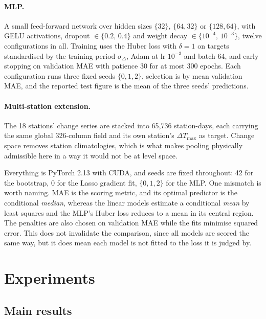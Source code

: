 \documentclass[11pt,a4paper]{article}
\newcommand{\dmax}{\Delta T_{\max}}
\begin{document}
\paragraph{MLP.} A small feed-forward network over hidden sizes $\{32\}$, $\{64,32\}$ or $\{128,64\}$, with GELU activations, dropout $\in \{0.2,\,0.4\}$ and weight decay $\in \{10^{-4},\,10^{-3}\}$, twelve configurations in all. Training uses the Huber loss with $\delta = 1$ on targets standardised by the training-period $\sigma_\Delta$, Adam at lr $10^{-3}$ and batch 64, and early stopping on validation MAE with patience 30 for at most 300 epochs. Each configuration runs three fixed seeds $\{0,1,2\}$, selection is by mean validation MAE, and the reported test figure is the mean of the three seeds' predictions.

\paragraph{Multi-station extension.} The 18 stations' change series are stacked into 65{,}736 station-days, each carrying the same global 326-column field and its own station's $\dmax$ as target. Change space removes station climatologies, which is what makes pooling physically admissible here in a way it would not be at level space.

Everything is PyTorch 2.13 with CUDA, and seeds are fixed throughout: 42 for the bootstrap, 0 for the Lasso gradient fit, $\{0,1,2\}$ for the MLP. One mismatch is worth naming. MAE is the scoring metric, and its optimal predictor is the conditional \emph{median}, whereas the linear models estimate a conditional \emph{mean} by least squares and the MLP's Huber loss reduces to a mean in its central region. The penalties are also chosen on validation MAE while the fits minimise squared error. This does not invalidate the comparison, since all models are scored the same way, but it does mean each model is not fitted to the loss it is judged by.

\section{Experiments}
\label{sec:experiments}

\subsection{Main results}
\label{sec:main}
\end{document}

